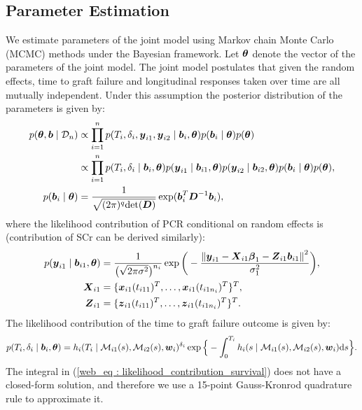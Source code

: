 \subsection{Parameter Estimation}
We estimate parameters of the joint model using Markov chain Monte Carlo (MCMC) methods under the Bayesian framework. Let $\boldsymbol{\theta}$ denote the vector of the parameters of the joint model. The joint model postulates that given the random effects, time to graft failure and longitudinal responses taken over time are all mutually independent. Under this assumption the posterior distribution of the parameters is given by:
\begin{align*}
p(\boldsymbol{\theta}, \boldsymbol{b} \mid \mathcal{D}_n) & \propto \prod_{i=1}^n p(T_i, \delta_i, \boldsymbol{y}_{i1},\boldsymbol{y}_{i2} \mid \boldsymbol{b}_{i}, \boldsymbol{\theta}) p(\boldsymbol{b}_{i} \mid \boldsymbol{\theta}) p(\boldsymbol{\theta})\\
& \propto \prod_{i=1}^n p(T_i, \delta_i \mid \boldsymbol{b}_i, \boldsymbol{\theta}) p(\boldsymbol{y}_{i1} \mid \boldsymbol{b}_{i1}, \boldsymbol{\theta}) p(\boldsymbol{y}_{i2} \mid \boldsymbol{b}_{i2}, \boldsymbol{\theta}) p(\boldsymbol{b}_i \mid \boldsymbol{\theta}) p(\boldsymbol{\theta}),\\
p(\boldsymbol{b}_i \mid \boldsymbol{\theta}) &= \frac{1}{\sqrt{(2 \pi)^q \text{det}(\boldsymbol{D})}} \exp(\boldsymbol{b}_i^T \boldsymbol{D}^{-1} \boldsymbol{b}_i),
\end{align*}
where the likelihood contribution of PCR conditional on random effects is (contribution of SCr can be derived similarly):
\begin{align*}
p(\boldsymbol{y}_{i1} \mid \boldsymbol{b}_{i1}, \boldsymbol{\theta}) &= \frac{1}{\big(\sqrt{2 \pi \sigma^2}\big)^{n_i}} \exp\bigg(-\frac{{\lVert{\boldsymbol{y}_{i1} - \boldsymbol{X}_{i1}\boldsymbol{\beta}_1 - \boldsymbol{Z}_{i1}\boldsymbol{b}_{i1}}\rVert}^2}{\sigma_1^2}\bigg),\\
\boldsymbol{X}_{i1} &= \{\boldsymbol{x}_{i1}(t_{i11})^T, \ldots, \boldsymbol{x}_{i1}(t_{i1n_i})^T\}^T,\\
\boldsymbol{Z}_{i1} &= \{\boldsymbol{z}_{i1}(t_{i11})^T, \ldots, \boldsymbol{z}_{i1}(t_{i1n_i})^T\}^T.
\end{align*}
The likelihood contribution of the time to graft failure outcome is given by:
\begin{equation}
\label{web_eq : likelihood_contribution_survival}
p(T_i, \delta_i \mid \boldsymbol{b}_i,\boldsymbol{\theta}) = h_i(T_i \mid \mathcal{M}_{i1}(s), \mathcal{M}_{i2}(s), \boldsymbol{w}_i)^{\delta_i} \exp\Big\{-\int_0^{T_i} h_i(s \mid \mathcal{M}_{i1}(s), \mathcal{M}_{i2}(s), \boldsymbol{w}_i)\mathrm{d}{s}\Big\}.
\end{equation}
The integral in (\ref{web_eq : likelihood_contribution_survival}) does not have a closed-form solution, and therefore we use a 15-point Gauss-Kronrod quadrature rule to approximate it.

